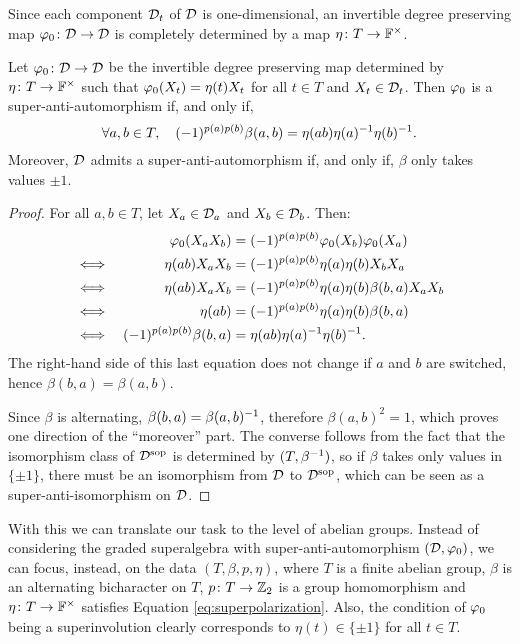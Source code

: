 Since each component $\mathcal{D}_t$ of $\mathcal{D}$ is one-dimensional, an invertible degree preserving map $\varphi_0\colon \mathcal{D} \to \mathcal{D}$ is completely determined by a map $\eta\colon T \to \mathbb{F}^\times$.

\begin{prop}\label{prop:superpolarization}
    Let $\varphi_0\colon \mathcal{D} \to \mathcal{D}$ be the invertible degree preserving map determined by $\eta\colon T \to \mathbb{F}^\times$  such that $\varphi_0(X_t) = \eta(t) X_t$ for all $t\in T$ and $X_t\in \mathcal{D}_t$. 
    Then $\varphi_0$ is a super-anti-automorphism if, and only if,
    \begin{equation}\label{eq:superpolarization}
        \forall a,b\in T, \quad (-1)^{p(a) p(b)} \beta(a,b) =  \eta(ab) \eta(a)^{-1} \eta(b)^{-1}.
    \end{equation}
    Moreover, $\mathcal{D}$ admits a super-anti-automorphism if, and only if, $\beta$ only takes values $\pm 1$.
\end{prop}

\begin{proof}
    For all $a,b \in T$, let $X_a \in \mathcal{D}_a$ and $X_b\in \mathcal{D}_b$. Then:
    \begin{alignat*}{2}
        &&\varphi_0(X_a X_b) &= (-1)^{p(a) p(b)} \varphi_0(X_b) \varphi_0(X_a)\\
        \iff&&\,\, \eta(ab)X_a X_b &= (-1)^{p(a) p(b)} \eta(a) \eta(b) X_b X_a\\
        \iff&&\, \eta(ab)X_a X_b &= (-1)^{p(a) p(b)} \eta(a) \eta(b) \beta(b,a) X_a X_b\\
        \iff&& \eta(ab) &= (-1)^{p(a) p(b)} \eta(a) \eta(b) \beta(b,a)
        \\
        \iff&& (-1)^{p(a) p(b)} \beta(b, a) &=  \eta(ab) \eta(a)^{-1} \eta(b)^{-1}.
    \end{alignat*}
    The right-hand side of this last equation does not change if $a$ and $b$ are switched, hence $\beta(b,a) = \beta(a,b)$. 
    
    Since $\beta$ is alternating, $\beta(b, a) = \beta (a, b)^{-1}$, therefore $\beta(a,b)^2 = 1$, which proves one direction of the ``moreover'' part.
    The converse follows from the fact that the isomorphism class of $\mathcal{D}^{\mathrm{sop}}$ is determined by $(T, \beta^{-1})$, so if $\beta$ takes only values in $\{ \pm 1 \}$, there must be an isomorphism from $\mathcal{D}$ to $\mathcal{D}^{\mathrm{sop}}$, which can be seen as a super-anti-isomorphism on $\mathcal{D}$.
\end{proof}

With this we can translate our task to the level of abelian groups. 
Instead of considering the graded superalgebra with super-anti-automorphism $(\mathcal{D}, \varphi_0)$, we can focus, instead, on the data $(T, \beta, p, \eta)$, where $T$ is a finite abelian group, $\beta$ is an alternating bicharacter on $T$, $p\colon T \to \mathbb{Z}_2$ is a group homomorphism and $\eta\colon T \to \mathbb{F}^\times$ satisfies Equation \eqref{eq:superpolarization}. 
Also, the condition of $\varphi_0$ being a superinvolution clearly corresponds to $\eta(t) \in \{ \pm 1 \}$ for all $t\in T$.

